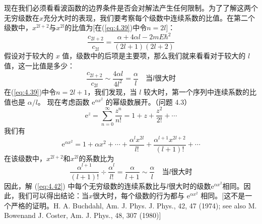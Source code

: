     现在我们必须看看波函数的边界条件是否会对解法产生任何限制。为了了解这两个无穷级数在$x$充分大时的表现，我们要考察每个级数中连续系数的比值。在第二个级数中，$x^{2l+2}$与$x^{2l}$的比值为[在(\ref{eq:4.39})中令$n=2l$]：
    \begin{equation*}
        \frac{c_{2l+2}}{c_{2l}} = \frac{\alpha + 4\alpha l - 2mE\hbar^2}{(2l+1)(2l+2)}
    \end{equation*}
    假设对于较大的 $x$ 值，级数中的后项是主要项，那么我们就来看看对于较大的 $l$ 值，这一比值是多少：
    \begin{equation}
        \frac{c_{2l+2}}{c_{2l}} \sim \frac{4\alpha l}{4l^2} = \frac{\alpha}{l} \quad \text{当}l\text{很大时}
        \label{eq:4.43}
    \end{equation}
    在(\ref{eq:4.39})中令$n=2l+1$，我们发现，当 $l$ 较大时，第一个序列中连续系数的比值也是 $\alpha/l$。 现在考虑函数 $\mathrm{e}^{\alpha x^2}$ 的幂级数展开。（问题 4.3）
    \begin{equation}
        \mathrm{e}^{z} = \sum_{n=0}^{\infty}\frac{z^n}{n!} = 1 + z + \frac{z^2}{2!} + \cdots
        \label{eq:4.44}
    \end{equation}
    我们有
    \begin{equation*}
        \mathrm{e}^{\alpha x^2} = 1 + \alpha x^2 + \cdots + \frac{\alpha ^l x^{2l}}{l!} + \frac{\alpha ^{l+1} x^{2l+2}}{(l+1)!} + \cdots
    \end{equation*}
    在该级数中，$x^{2l+2}$和$x^{2l}$的系数比为
    \begin{equation*}
        \frac{\alpha^{l+1}}{\left(l+1\right)!} \div \frac{\alpha^l}{l!} = \frac{\alpha}{l+1} \sim \frac{\alpha}{l} \quad \text{当}l\text{很大时}
    \end{equation*}
    因此，解 (\ref{eq:4.42}) 中每个无穷级数的连续系数比与$l$很大时的级数$\mathrm{e}^{\alpha x^2}$相同。因此，我们可以得出结论：当$x$很大时，每个级数的行为都与 $\mathrm{e}^{\alpha x^2}$ 相同。[这不是一个严格的证明。H. A. Buchdahl, Am. J. Phys. J. Phys., 42, 47 (1974); see also M. Bowenand J. Coster, Am. J. Phys., 48, 307 (1980)]

